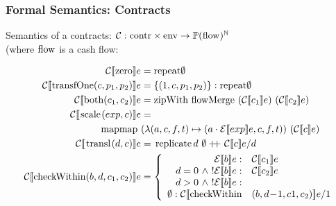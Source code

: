 \documentclass[xcolor=dvipsnames,12pt]{beamer}
\begin{document}
\begin{frame}
    \frametitle{Formal Semantics: Contracts}

Semantics of a contracts: $ \mathcal{C} : \ttt{contr} \times \ttt{env} 
          \rightarrow \mathbb{P}(\ttt{flow})^\mathbb{N}$\\
{\footnotesize
(where $\ttt{flow}$ is a cash flow: 
}

{\footnotesize
\begin{align*}
\csem{\zero}{e}{\ttt{repeat} \emptyset}\\
\csem{\transfOne(c,p_1,p_2)}{e}{\{(1,c,p_1,p_2)\} : \ttt{repeat} \emptyset }\\
\csem{\both(c_1,c_2)}{e}{\ttt{zipWith flowMerge }\ (\mathcal{C}\sem{c_1}e)\ (\mathcal{C}\sem{c_2}e)}\\
\csem{\scale(exp,c)}{e}{}\\
\ttt{mapmap}\ &(\lambda (a,c,f,t)\mapsto(a\cdot\mathcal{E}\sem{exp}e,c,f,t))\ (\mathcal{C}\sem{c}e)\\
\csem{\transl(d,c)}{e}{\ttt{replicate }d \ \emptyset +\!\!\!+\  \mathcal{C}\sem{c}e/d}\\
\csem{\checkWithin(b,d,c_1,c_2)}{e}{
\left \{
\begin{array}{rl}
\mathcal{E}\sem{b}e: & \mathcal{C}\sem{c_1}e\\
d = 0\ \wedge\ !\mathcal{E}\sem{b}e: & \mathcal{C}\sem{c_2}e\\
d > 0\ \wedge\ !\mathcal{E}\sem{b}e:\\
\emptyset : \mathcal{C}\sem{\checkWithin&(b,d\!-\!1,c1,c_2)}e/1\\
\end{array}\right.
}
\end{align*}
}

\end{frame}
\end{document}
